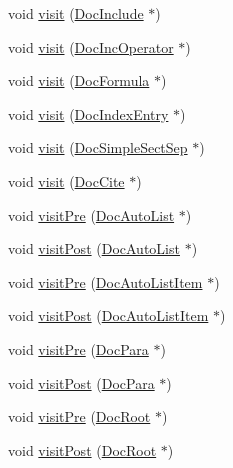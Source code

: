 \begin{DoxyCompactItemize}
void \hyperlink{class_latex_doc_visitor_a45b89788c006359714fb21b188036f18}{visit} (\hyperlink{class_doc_include}{Doc\+Include} $\ast$)
\item 
void \hyperlink{class_latex_doc_visitor_a7ca3a043e4adcb9e77ab1785f545fec1}{visit} (\hyperlink{class_doc_inc_operator}{Doc\+Inc\+Operator} $\ast$)
\item 
void \hyperlink{class_latex_doc_visitor_a3b67b075054656ea32cb0839dfd24209}{visit} (\hyperlink{class_doc_formula}{Doc\+Formula} $\ast$)
\item 
void \hyperlink{class_latex_doc_visitor_a89d5d91d7afe86c8ba14d945eaad38c3}{visit} (\hyperlink{class_doc_index_entry}{Doc\+Index\+Entry} $\ast$)
\item 
void \hyperlink{class_latex_doc_visitor_a9ee0617d92473b9c3308a0f373edc85a}{visit} (\hyperlink{class_doc_simple_sect_sep}{Doc\+Simple\+Sect\+Sep} $\ast$)
\item 
void \hyperlink{class_latex_doc_visitor_ac8d00002a56209c15d60c3c72a86085b}{visit} (\hyperlink{class_doc_cite}{Doc\+Cite} $\ast$)
\item 
void \hyperlink{class_latex_doc_visitor_a7671b8a83c79b7d8c6423d99847b69f2}{visit\+Pre} (\hyperlink{class_doc_auto_list}{Doc\+Auto\+List} $\ast$)
\item 
void \hyperlink{class_latex_doc_visitor_a10d7a4926f063f3575028741f6a3b9d2}{visit\+Post} (\hyperlink{class_doc_auto_list}{Doc\+Auto\+List} $\ast$)
\item 
void \hyperlink{class_latex_doc_visitor_aa79af0731b2926239206842f85f51cbc}{visit\+Pre} (\hyperlink{class_doc_auto_list_item}{Doc\+Auto\+List\+Item} $\ast$)
\item 
void \hyperlink{class_latex_doc_visitor_ae4158834dc8ba0a69392ef2f7facb719}{visit\+Post} (\hyperlink{class_doc_auto_list_item}{Doc\+Auto\+List\+Item} $\ast$)
\item 
void \hyperlink{class_latex_doc_visitor_adca45189114959345e7b80c5209dd328}{visit\+Pre} (\hyperlink{class_doc_para}{Doc\+Para} $\ast$)
\item 
void \hyperlink{class_latex_doc_visitor_ad851c37ba909c1ab1343caa9f3d8fdd9}{visit\+Post} (\hyperlink{class_doc_para}{Doc\+Para} $\ast$)
\item 
void \hyperlink{class_latex_doc_visitor_ae5c8186c04b867fb7db1092cbc79cd8f}{visit\+Pre} (\hyperlink{class_doc_root}{Doc\+Root} $\ast$)
\item 
void \hyperlink{class_latex_doc_visitor_a004b46d3fa4eeb9e285ab35322fd6cf8}{visit\+Post} (\hyperlink{class_doc_root}{Doc\+Root} $\ast$)
\item 

\end{DoxyCompactItemize}
